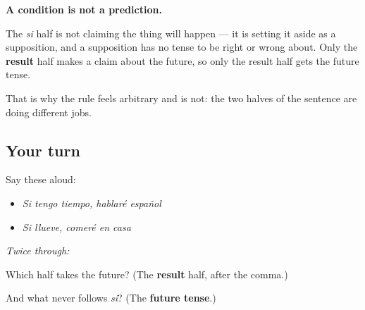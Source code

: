\begin{culture}
\textbf{A condition is not a prediction.}

The \emph{si} half is not claiming the thing will happen — it is setting it aside as a supposition, and a supposition has no tense to be right or wrong about. Only the \textbf{result} half makes a claim about the future, so only the result half gets the future tense.

That is why the rule feels arbitrary and is not: the two halves of the sentence are doing different jobs.
\end{culture}

\subsection*{Your turn}
Say these aloud:

\begin{itemize}
\raggedright
  \item \emph{Si tengo tiempo, hablaré español}
  \item \emph{Si llueve, comeré en casa}
\end{itemize}

\emph{Twice through:}

\begin{tcolorbox}[breakable,colback=teal!4,colframe=teal!35!black,title={Before you move on}]
Which half takes the future? (The \textbf{result} half, after the comma.)

And what never follows \emph{si}? (The \textbf{future tense}.)
\end{tcolorbox}
